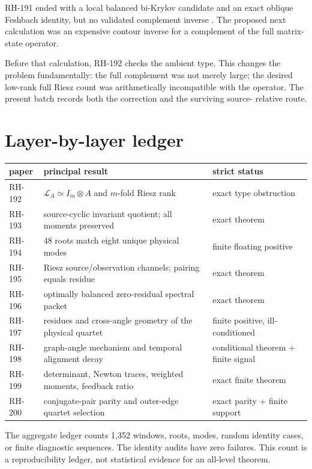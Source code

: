 \documentclass[12pt]{article}
\theoremstyle{remark}
\begin{document}
RH-191 ended with a local balanced bi-Krylov candidate and an exact oblique
Feshbach identity, but no validated complement inverse
\citep{WangRH191}.  The proposed next calculation was an expensive contour
inverse for a complement of the full matrix-state operator.

Before that calculation, RH-192 checks the ambient type.  This changes the
problem fundamentally: the full complement was not merely large; the desired
low-rank full Riesz count was arithmetically incompatible with the operator.
The present batch records both the correction and the surviving source-
relative route.

\section{Layer-by-layer ledger}

\begin{center}
\small
\begin{tabular}{p{}p{}p{}}
\toprule
paper & principal result & strict status\\
\midrule
RH-192 & $\mathcal L_A\simeq I_m\otimes A$ and $m$-fold Riesz rank
& exact type obstruction\\
RH-193 & source-cyclic invariant quotient; all moments preserved
& exact theorem\\
RH-194 & 48 roots match eight unique physical modes
& finite floating positive\\
RH-195 & Riesz source/observation channels; pairing equals residue
& exact theorem\\
RH-196 & optimally balanced zero-residual spectral packet
& exact theorem\\
RH-197 & residues and cross-angle geometry of the physical quartet
& finite positive, ill-conditioned\\
RH-198 & graph-angle mechanism and temporal alignment decay
& conditional theorem + finite signal\\
RH-199 & determinant, Newton traces, weighted moments, feedback ratio
& exact finite theorem\\
RH-200 & conjugate-pair parity and outer-edge quartet selection
& exact parity + finite support\\
\bottomrule
\end{tabular}
\end{center}

The aggregate ledger counts 1,352 windows, roots, modes, random identity
cases, or finite diagnostic sequences.  The identity audits have zero
failures.  This count is a reproducibility ledger, not statistical evidence
for an all-level theorem.
\end{document}
